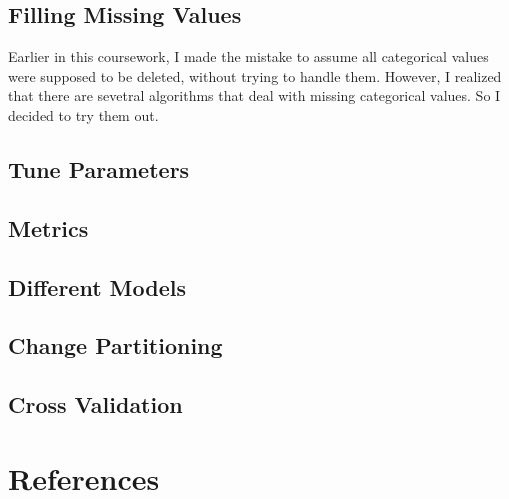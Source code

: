 \documentclass[a4paper,12pt]{article}\usepackage[]{graphicx}\usepackage[]{color}
\begin{document}
\subsection{Filling Missing Values}\label{filling_missing}
Earlier in this coursework, I made the mistake to assume all categorical values were supposed to be deleted, without trying to handle them. However, I realized that there are sevetral algorithms that deal with missing categorical values. So I decided to try them out.

\subsection{Tune Parameters}\label{tuning}

\subsection{Metrics}\label{metrics}
\subsection{Different Models}\label{different_models}
\subsection{Change Partitioning}\label{change_partitioning}
\subsection{Cross Validation}\label{cross_validation}

\clearpage

\section{References}\label{pubs}

\printbibliography[heading =none]


\clearpage
\end{document}
